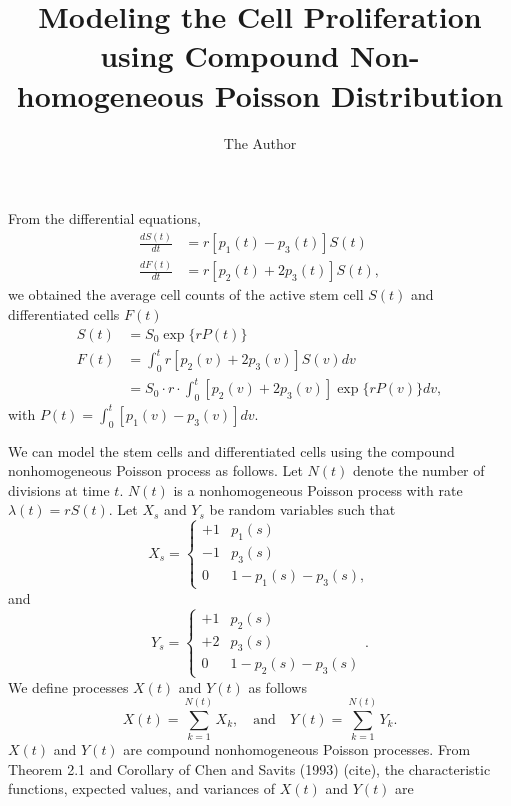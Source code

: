 \documentclass[12pt]{article}
\title{Modeling the Cell Proliferation using Compound Non-homogeneous Poisson Distribution}
\author{The Author}
\date{} %
\begin{document}
\maketitle
From the differential equations, 
\begin{equation}
\begin{split}
\frac{dS(t)}{dt} &= r[p_1(t) - p_3(t)] S(t) \\
\frac{dF(t)}{dt} &= r[p_2(t) + 2p_3(t)] S(t),
\end{split}
\end{equation}
we obtained the average cell counts of the active stem cell $S(t)$ and differentiated cells $F(t)$
\begin{equation}
\begin{split}
S(t) & = S_0 \exp \Big\{ r P(t) \Big\} \\
F(t) & = \int_0^t r  [p_2(v) + 2p_3(v)] S(v) dv\\
&= S_0 \cdot r \cdot \int_0^t [p_2(v) + 2p_3(v)] \exp \Big\{r P(v) \Big\} dv,
\end{split}
\end{equation}
with $P(t) = \int_0^t [p_1(v) - p_3(v)] dv$.

We can model the stem cells and differentiated cells using the compound nonhomogeneous Poisson process as follows. Let $N(t)$ denote the number of divisions at time $t$. $N(t)$ is a nonhomogeneous Poisson process with rate $\lambda(t) = r S(t)$. Let $X_s$ and $Y_s$ be random variables such that 
\begin{equation}
X_s = \begin{cases}
+1 & p_1(s) \\
-1 & p_3(s) \\
0 & 1- p_1(s) - p_3(s),
\end{cases}
\end{equation}
and 
\begin{equation}
Y_s = \begin{cases}
+1 & p_2(s) \\
+2 & p_3(s) \\
0 & 1-p_2(s)- p_3(s)
\end{cases}.
\end{equation}
We define processes $X(t)$ and $Y(t)$ as follows
\begin{equation} 
X(t) = \sum_{k=1}^{N(t)} X_{k}, \quad \text{and} \quad
Y(t) = \sum_{k=1}^{N(t)} Y_{k}.
\end{equation}
$X(t)$ and $Y(t)$ are compound nonhomogeneous Poisson processes. From Theorem 2.1 and Corollary of Chen and Savits (1993) (cite), the characteristic functions, expected values, and variances of $X(t)$ and $Y(t)$ are
\end{document}
